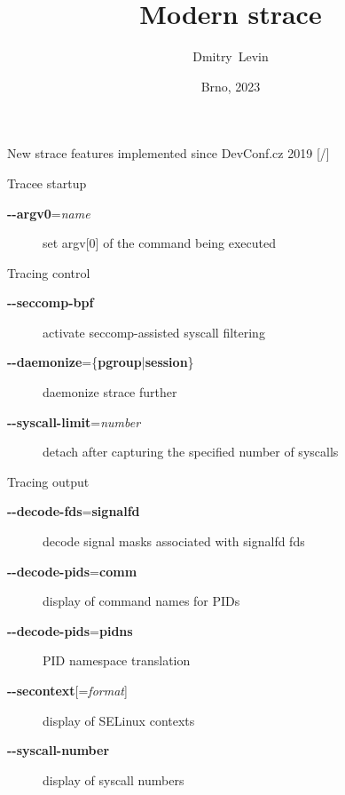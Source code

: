 \documentclass[unicode,aspectratio=169,xcolor={table,dvipsnames,usernames}]{beamer}
\title{\Huge Modern strace}
\author{\LARGE Dmitry~Levin}
\date{\Large Brno, 2023}
\begin{document}
\begin{frame}[noframenumbering]
\titlepage
\end{frame}

\begin{frame}{New strace features implemented since DevConf.cz 2019 \hfill [\insertframenumber/\inserttotalframenumber]}
\begin{block}{Tracee startup}
\begin{description}
	\item[\textbf{-{}-argv0}=\textit{name}] set argv[0] of the command being executed
\end{description}
\end{block}

\begin{block}{Tracing control}
\begin{description}
	\item[\textbf{-{}-seccomp-bpf}] activate seccomp-assisted syscall filtering
	\item[\textbf{-{}-daemonize}=\{\textbf{pgroup}|\textbf{session}\}] daemonize strace further
	\item[\textbf{-{}-syscall-limit}=\textit{number}] detach after capturing the specified number of syscalls
\end{description}
\end{block}

\begin{block}{Tracing output}
\begin{description}
	\item[\textbf{-{}-decode-fds}=\textbf{signalfd}] decode signal masks associated with signalfd fds
	\item[\textbf{-{}-decode-pids}=\textbf{comm}] display of command names for PIDs
	\item[\textbf{-{}-decode-pids}=\textbf{pidns}] PID namespace translation
	\item[\textbf{-{}-secontext}[=\textit{format}{]}] display of SELinux contexts
	\item[\textbf{-{}-syscall-number}] display of syscall numbers
\end{description}
\end{block}
\end{frame}
\end{document}
